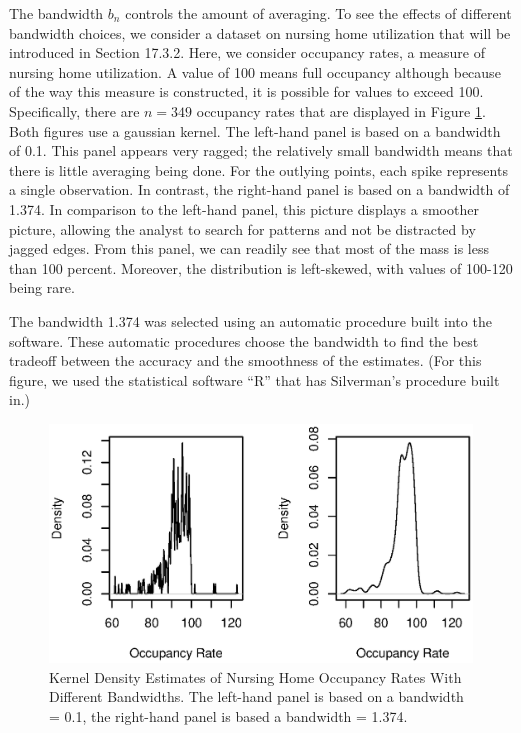 
The bandwidth $b_n$ controls the amount of averaging. To see the
effects of different bandwidth choices, we consider a dataset on
nursing home utilization that will be introduced in Section 17.3.2.
Here, we consider occupancy rates, a measure of nursing home
utilization. A value of 100 means full occupancy although because of
the way this measure is constructed, it is possible for values to
exceed 100. Specifically, there are $n=349$ occupancy rates that are
displayed in Figure \ref{F15:KernelDensity1}. Both figures use a
gaussian kernel. The left-hand panel is based on a bandwidth of 0.1.
This panel appears very ragged; the relatively small bandwidth means
that there is little averaging being done. For the outlying points,
each spike represents a single observation. In contrast, the
right-hand panel is based on a bandwidth of 1.374. In comparison to
the left-hand panel, this picture displays a smoother picture,
allowing the analyst to search for patterns and not be distracted by
jagged edges. From this panel, we can readily see that most of the
mass is less than 100 percent. Moreover, the distribution is
left-skewed, with values of 100-120 being rare.

The bandwidth 1.374 was selected using an automatic procedure built
into the software. These automatic procedures choose the bandwidth
to find the best tradeoff between the accuracy and the smoothness of
the estimates. (For this figure, we used the statistical software
``R'' that has Silverman's procedure built in.)


\begin{figure}[htp]
  \begin{center}
    \includegraphics[width=1\textwidth]
        {Chapter15MiscTopics/F15KernelDensity1.eps}
      \end{center}
        \caption {\label{F15:KernelDensity1}
           {\small Kernel Density Estimates of Nursing Home Occupancy Rates With Different Bandwidths.
           The left-hand panel is based on a bandwidth = 0.1, the right-hand panel is based a bandwidth = 1.374.}}
\end{figure}


